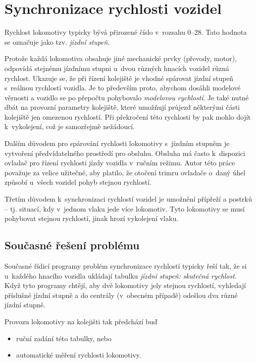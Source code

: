 \section{Synchronizace rychlosti vozidel}

Rychlost lokomotivy typicky bývá přirozené číslo v~rozsahu $0$--$28$. Tato
hodnota se označuje jako tzv. \textit{jízdní stupeň}.

Protože každá lokomotiva obsahuje jiné mechanické prvky (převody, motor),
odpovídá stejnému jízdnímu stupni u~dvou různých hnacích vozidel různá
rychlost. Ukazuje se, že při řízení kolejiště je vhodné spárovat jízdní stupeň
s~reálnou rychlostí vozidla. Je to především proto, abychom dosáhli modelové
věrnosti a vozidlo se po přepočtu pohybovalo \textit{modelovou rychlostí}. Je
také nutné dbát na provozní parametry kolejiště, které umožňují průjezd
některými části kolejiště jen omezenou rychlostí. Při překročení této rychlosti
by pak mohlo dojít k~vykolejení, což je samozřejmě nežádoucí.

Dalším důvodem pro spárování rychlosti lokomotivy s~jízdním stupněm je
vytvoření předvídatelného prostředí pro obsluhu. Obsluha má často k~dispozici
ovladač pro řízení rychlosti jízdy vozidla v~ručním režimu. Autor této práce
považuje za velice užitečné, aby platilo, že otočení trimru ovladače o~daný
úhel způsobí u~všech vozidel pohyb stejnou rychlostí.

Třetím důvodem k~synchronizaci rychlostí vozidel je umožnění přípřeží a postrků
-- tj.  situací, kdy v~jednom vlaku jede více lokomotiv. Tyto lokomotivy se
musí pohybovat stejnou rychlostí, jinak hrozí vykolejení vlaku.

\subsection{Současné řešení problému}

Současné řídicí programy problém synchronizace rychlostí typicky řeší tak, že
si u~každého hnacího vozidla ukládají tabulku \textit{jízdní stupeň: skutečná
rychlost}. Když tyto programy chtějí, aby dvě lokomotivy jely stejnou rychlostí,
vyhledají příslušné jízdní stupně a do centrály (v~obecném případě) odešlou
dva různé jízdní stupně.

Provozu lokomotivy na kolejišti tak předchází buď

\begin{itemize}
	\item ruční zadání této tabulky, nebo
	\item automatické měření rychlosti lokomotivy.
\end{itemize}

